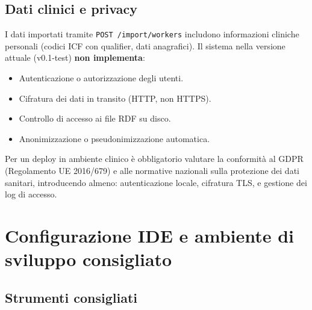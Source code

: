 \documentclass[a4paper,12pt]{article}
\begin{document}
\subsection{Dati clinici e privacy}

\begin{warningbox}
I dati importati tramite \texttt{POST /import/workers} includono
informazioni cliniche personali (codici ICF con qualifier, dati
anagrafici). Il sistema nella versione attuale (v0.1-test) \textbf{non
implementa}:
\begin{itemize}[noitemsep]
  \item Autenticazione o autorizzazione degli utenti.
  \item Cifratura dei dati in transito (HTTP, non HTTPS).
  \item Controllo di accesso ai file RDF su disco.
  \item Anonimizzazione o pseudonimizzazione automatica.
\end{itemize}
Per un deploy in ambiente clinico \`{e} obbligatorio valutare la
conformit\`{a} al GDPR (Regolamento UE 2016/679) e alle normative
nazionali sulla protezione dei dati sanitari, introducendo almeno:
autenticazione locale, cifratura TLS, e gestione dei log di accesso.
\end{warningbox}

\section{Configurazione IDE e ambiente di sviluppo consigliato}

\subsection{Strumenti consigliati}
\end{document}
